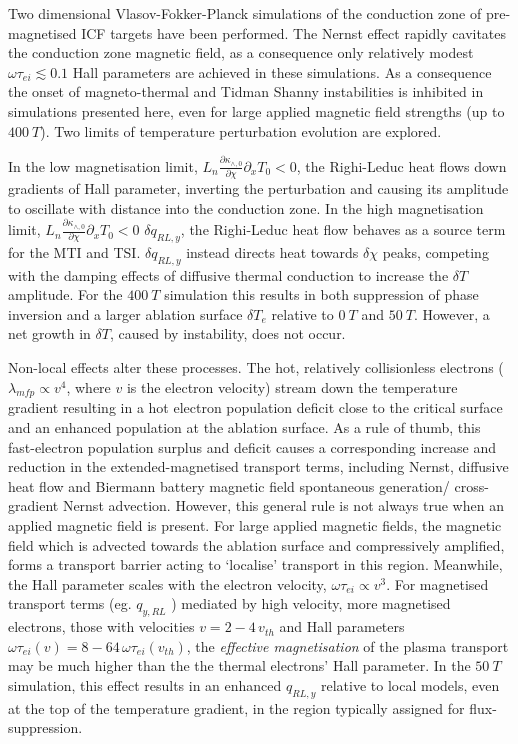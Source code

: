 \documentclass[aip,reprint]{revtex4-1}
\begin{document}
Two dimensional Vlasov-Fokker-Planck simulations of the conduction zone of pre-magnetised ICF targets have been performed. The Nernst effect rapidly cavitates the conduction zone magnetic field, as a consequence only relatively modest $\omega \tau_{ei} \lesssim 0.1$ Hall parameters are achieved in these simulations.  As a consequence the onset of magneto-thermal and Tidman Shanny instabilities is inhibited in simulations presented here, even for large applied magnetic field strengths (up to $\SI{400}{T}$). Two limits of temperature perturbation evolution are explored. 

In the low magnetisation limit, $L_n \frac{\partial \kappa_{\wedge,0}}{\partial \chi} \partial_x T_0 < 0$, the Righi-Leduc heat flows down gradients of Hall parameter, inverting the perturbation and causing its amplitude to oscillate with distance into the conduction zone. In the high magnetisation limit, $L_n \frac{\partial \kappa_{\wedge,0}}{\partial \chi} \partial_x T_0 < 0$ $\delta q_{RL,y}$, the Righi-Leduc heat flow behaves as a source term for the MTI and TSI. $\delta q_{RL,y}$ instead directs heat towards $\delta \chi$ peaks, competing with the damping effects of diffusive thermal conduction to increase the $\delta T$ amplitude. For the $\SI{400}{T}$ simulation this results in both suppression of phase inversion and a larger ablation surface $\delta T_e$ relative to $\SI{0}{T}$ and $\SI{50}{T}$. However,  a net growth in $\delta T$,  caused by instability, does not occur.


Non-local effects alter these processes. The hot, relatively collisionless electrons ($\lambda_{mfp} \propto v^4$, where $v$ is the electron velocity) stream down the temperature gradient resulting in a hot electron population deficit close to the critical surface and an enhanced population at the ablation surface.  As a rule of thumb, this fast-electron population surplus and deficit causes a corresponding increase and reduction in the extended-magnetised transport terms, including Nernst, diffusive heat flow and Biermann battery magnetic field spontaneous generation/ cross-gradient Nernst advection. However, this general rule is not always true when an applied magnetic field is present. For large applied magnetic fields, the magnetic field which is advected towards the ablation surface and compressively amplified, forms a transport barrier acting to `localise’ transport in this region. Meanwhile, the Hall parameter scales with the electron velocity, $\omega \tau_{ei} \propto v^{3}$. For magnetised transport terms (eg. $q_{y,RL}$ \cite{Kho1985}) mediated by high velocity, more magnetised electrons, those with velocities $v=2 - 4\,\si{v_{th}}$ and Hall parameters $\omega \tau_{ei}(v) = 8-64 \,\omega \tau_{ei}(\si{v_{th}})$, the \emph{effective magnetisation} of the plasma transport may be much higher than the the thermal electrons' Hall parameter. In the $\SI{50}{T}$ simulation, this effect results in an enhanced $q_{RL,y}$ relative to local models, even at the top of the temperature gradient, in the region typically assigned for flux-suppression. 
\end{document}
